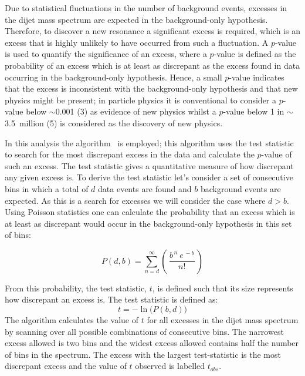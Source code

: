 Due to statistical fluctuations in the number of background events,
excesses in the dijet mass spectrum are expected in the background-only hypothesis.
Therefore, to discover a new resonance a significant excess is required,
which is an excess that is highly unlikely to have occurred from such a fluctuation.
A \mbox{$p$-value} is used to quantify the significance of an excess,
where a \mbox{$p$-value} is defined as the probability of an excess which is at least as discrepant as the excess found in data
occurring in the background-only hypothesis.
Hence, a small \mbox{$p$-value} indicates that the excess is inconsistent with the background-only hypothesis and that new physics might be present;
in particle physics it is conventional to consider a \mbox{$p$-value} below $\sim$0.001 (3\sigma) as evidence of new physics
whilst a \mbox{$p$-value} below 1 in $\sim$3.5~million (5\sigma) is considered as the discovery of new physics.

In this analysis the \bh{} algorithm~\cite{dibjet-bh} is employed;
this algorithm uses the \bh{} test statistic to 
search for the most discrepant excess in the data
and calculate the \mbox{$p$-value} of such an excess.
The \bh{} test statistic gives a quantitative measure of how discrepant any given excess is.
To derive the test statistic let's consider a set of consecutive bins in which
a total of $d$ data events are found and $b$ background events are expected.
As this is a search for excesses we will consider the case where $d > b$.
Using Poisson statistics one can calculate the probability that an excess which is at least as discrepant
would occur in the background-only hypothesis in this set of bins:

\begin{equation}
  P(d,b) = \sum_{n=d}^{\infty} \left(\,\frac{b^{\,n}~e^{\,-b}}{n!}\,\right)
\end{equation}


From this probability, the \bh{} test statistic, $t$, is defined such that its size represents how discrepant an excess is.
The \bh{} test statistic is defined as:
\begin{equation}
 t = -\ln{\big(P(b,d)\big)}
\end{equation}
The \bh{} algorithm calculates the value of $t$ for all excesses in the dijet mass spectrum
by scanning over all possible combinations of consecutive bins.
The narrowest excess allowed is two bins and the widest excess allowed contains half the number of bins in the spectrum.
The excess with the largest \bh{} test-statistic is the most discrepant excess and the value of $t$ observed is labelled $t_{obs}$.

